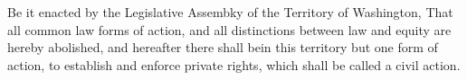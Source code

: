 Be it enacted by the Legislative Assembky of the Territory of Washington, That all common law forms of action, and all distinctions between law and equity are hereby abolished, and hereafter there shall bein this territory but one form of action, to establish and enforce private rights, which shall be called a civil action.